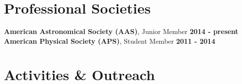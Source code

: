 \documentclass[margin]{res}
\begin{document}
\begin{resume}
\section{Professional Societies}
{\bf American Astronomical Society (AAS)}, Junior Member  \hfill {\bf 2014 - present}\\
{\bf American Physical Society (APS)}, Student Member  \hfill {\bf 2011 - 2014}




\section{Activities \& Outreach} %


\end{resume}
\end{document}
